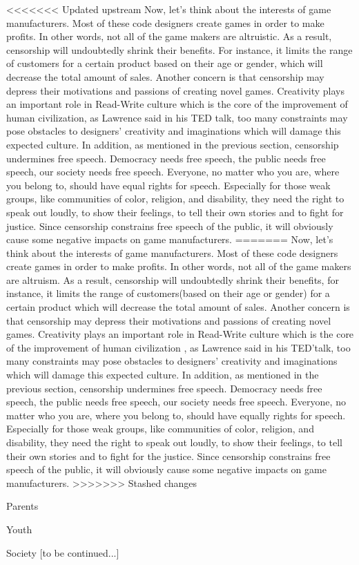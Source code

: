 <<<<<<< Updated upstream
Now,  let's think about the interests of game manufacturers. Most of these code designers create games in order to make profits. In other words, not all of the game makers are altruistic. As a result, censorship will undoubtedly shrink their benefits. For instance, it limits the range of customers for a certain product based on their age or gender, which will decrease the total amount of sales. Another concern is that censorship may depress their motivations and passions of creating novel games. Creativity plays an important role in Read-Write culture which is the core of the improvement of human civilization, as Lawrence said in his TED talk, too many constraints may pose obstacles to designers' creativity and imaginations which will damage this expected culture. In addition, as mentioned in the previous section, censorship undermines free speech. Democracy needs free speech, the public needs free speech, our society needs free speech. Everyone, no matter who you are, where you belong to, should have equal rights for speech. Especially for those weak groups, like communities of color, religion, and disability, they need the right to speak out loudly, to show their feelings, to tell their own stories and to fight for justice. Since censorship constrains free speech of the public, it will obviously cause some negative impacts on game manufacturers.
=======
Now, let's think about the interests of game manufacturers. Most of these code designers create games in order to make profits. In other words,  not all of the game makers are altruism. As a result, censorship will undoubtedly shrink their benefits, for instance, it limits the range of customers(based on their age or gender) for a certain product which will decrease the total amount of sales. Another concern is that censorship may depress their motivations and passions of creating novel games. Creativity plays an important role in Read-Write culture which is the core of the improvement of human civilization , as Lawrence said in his TED'talk, too many constraints may pose obstacles to designers' creativity and imaginations which will damage this expected culture. In addition, as mentioned in the previous section, censorship undermines free speech. Democracy needs free speech, the public needs free speech, our society needs free speech. Everyone, no matter who you are, where you belong to, should have equally rights for speech. Especially for those weak groups, like communities of color, religion, and disability, they need the right to speak out loudly, to show their feelings, to tell their own stories and to fight for the justice. Since censorship constrains free speech of the public, it will obviously cause some negative impacts on game manufacturers.
>>>>>>> Stashed changes

Parents

Youth

Society
[to be continued...]










